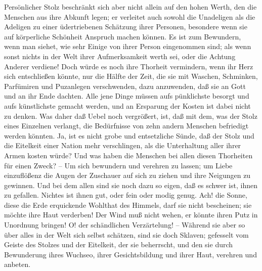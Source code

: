 Persönlicher Stolz beschränkt sich aber nicht allein auf den hohen Werth, den die Menschen aus ihre Abkunft legen; er verleitet auch sowohl die Unadeligen als die Adeligen zu einer üdertriebenen Schätzung ihrer Personen, besondere wenn sie auf körperliche Schönheit Anspruch machen können. Es ist zum Bewundern, wenn man siehet, wie sehr Einige von ihrer Person eingenommen sind; als wenn sonst nichts in der Welt ihrer Aufmerksamkeit werth sei, oder die Achtung Anderer verdiene! Doch würde es noch ihre Thorheit vermindern, wenn ihr Herz sich entschließen könnte, nur die Hälfte der Zeit, die sie mit Waschen, Schminken, Parfümiren und Puzanlegen verschwenden, dazu anzuwenden, daß sie an Gott und an ihr Ende dachten. Alle jene Dinge müssen aufs pünklichste besorgt und aufs künstlichste gemacht werden, und an Ersparung der Kosten ist dabei nicht zu denken. Was daher daß Uebel noch vergrößert, ist, daß mit dem, was der Stolz eines Einzelnen verlangt, die Bedürfnisse von zehn andern Menschen befriedigt werden könnten. Ja, ist es nicht grobe und entsetzliche Sünde, daß der Stolz und die Eitelkeit einer Nation mehr verschlingen, als die Unterhaltung aller ihrer Armen kosten würde? Und was haben die Menschen bei allen diesen Thorheiten für einen Zweck? -- Um sich bewundern und verehren zu lassen; um Liebe einzuflößenz die Augen der Zuschauer auf sich zu ziehen und ihre Neigungen zu gewinnen. Und bei dem allen sind sie noch dazu so eigen, daß es schwer ist, ihnen zu gefallen. Nichtes ist ihnen gut, oder fein oder modig genug. Ach! die Sonne, diese die Erde erquickende Wohlthat des Himmels, darf sie nicht bescheinen; sie möchte ihre Haut verderben! Der Wind muß nicht wehen, er könnte ihren Putz in Unordnung bringen! O! der schändlichen Verzärtelung! -- Während sie aber so über alles in der Welt sich selbst schätzen, sind sie doch Sklaven; gefesselt vom Geiste des Stolzes und der Eitelkeit, der sie beherrscht, und den sie durch Bewunderung ihres Wuchseo, ihrer Gesichtsbildung und ihrer Haut, verehren und anbeten.

